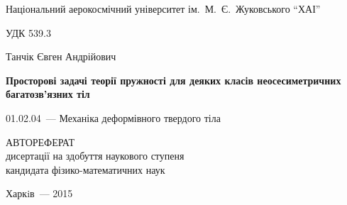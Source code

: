 \documentclass[book,14pt,small,oneside]{ncc}
\begin{document}
\indentaftersection
{}

\begin{titlepage}
\begin{center}
Національний аерокосмічний університет ім.~М.~Є.~Жуковського ``ХАІ''
\end{center}
\vskip1cm
\begin{flushright}
УДК 539.3
\end{flushright}
\vskip2cm
\begin{center}
\large Танчік Євген Андрійович
\end{center}
\vskip1cm
\begin{center}
\Large\bf Просторові задачі теорії пружності для деяких класів неосесиметричних багатозв'язних тіл
\end{center}
\vskip2cm
\begin{center}
01.02.04~--- Механіка деформівного твердого тіла
\end{center}
\vskip4cm
\begin{center}
АВТОРЕФЕРАТ \\
дисертації на здобуття наукового ступеня \\
кандидата фізико-математичних наук
\end{center}
\vskip2cm
\vskip3cm
\begin{center}
Харкiв~--- 2015
\end{center}
\end{titlepage}
\end{document}

